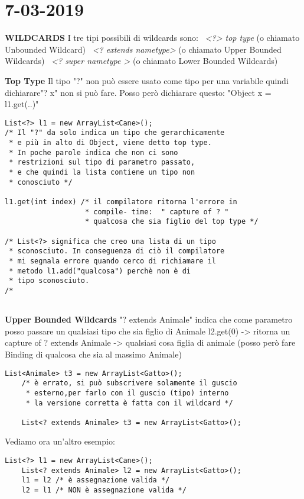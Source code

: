 

\newpage
\section{7-03-2019}
\textbf{WILDCARDS} \newline
I tre tipi possibili di wildcards sono: \newline
\textbullet\ \textit{<?> top type} (o chiamato Unbounded Wildcard) \newline
\textbullet\ \textit{<? extends nametype>} (o chiamato Upper Bounded Wildcards)\newline
\textbullet\ \textit{<? super nametype >} (o chiamato Lower Bounded Wildcards)\newline

\noindent \textbf{Top Type} \newline
Il tipo "?" non può essere usato come tipo per una variabile quindi dichiarare"? x" non si può fare. Posso però dichiarare questo: "Object x = l1.get(..)"
\begin{lstlisting}[basicstyle=\small,]
List<?> l1 = new ArrayList<Cane>();
/* Il "?" da solo indica un tipo che gerarchicamente
 * e più in alto di Object, viene detto top type.
 * In poche parole indica che non ci sono 
 * restrizioni sul tipo di parametro passato,
 * e che quindi la lista contiene un tipo non
 * conosciuto */

l1.get(int index) /* il compilatore ritorna l'errore in
				   * compile- time:  " capture of ? " 
				   * qualcosa che sia figlio del top type */
				   
/* List<?> significa che creo una lista di un tipo
 * sconosciuto. In conseguenza di ciò il compilatore 
 * mi segnala errore quando cerco di richiamare il
 * metodo l1.add("qualcosa") perchè non è di
 * tipo sconosciuto.	
/*
			   
\end{lstlisting}

\noindent \textbf{Upper Bounded Wildcards} \newline
"? extends Animale" indica che come parametro posso passare un qualsiasi tipo che sia figlio di Animale \newline
l2.get(0) -> ritorna un capture of ? extends Animale -> qualsiasi cosa figlia di animale (posso però fare Binding di qualcosa che sia al massimo Animale) \newline

\begin{lstlisting}[basicstyle=\small,]
	List<Animale> t3 = new ArrayList<Gatto>();
	/* è errato, si può subscrivere solamente il guscio
	 * esterno,per farlo con il guscio (tipo) interno
	 * la versione corretta è fatta con il wildcard */
	
	List<? extends Animale> t3 = new ArrayList<Gatto>();
\end{lstlisting}
Vediamo ora un'altro esempio:
\begin{lstlisting}[basicstyle=\small,]
	List<?> l1 = new ArrayList<Cane>();
	List<? extends Animale> l2 = new ArrayList<Gatto>();
	l1 = l2 /* è assegnazione valida */
	l2 = l1 /* NON è assegnazione valida */
\end{lstlisting}

